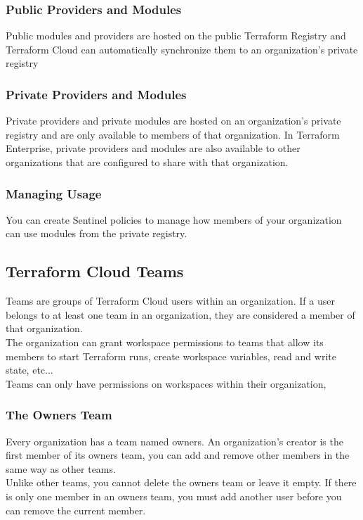 \documentclass[12pt, letterpaper, twoside]{article}
\begin{document}
\subsubsection{Public Providers and Modules}
Public modules and providers are hosted on the public Terraform Registry and Terraform Cloud can automatically 
synchronize them to an organization's private registry

\subsubsection{Private Providers and Modules}
Private providers and private modules are hosted on an organization's private registry and are only 
available to members of that organization. In Terraform Enterprise, private providers and modules are 
also available to other organizations that are configured to share with that organization.

\subsubsection{Managing Usage}
You can create Sentinel policies to manage how members of your organization can use modules from the private 
registry.

\subsection{Terraform Cloud Teams}
Teams are groups of Terraform Cloud users within an organization. If a user belongs to at least one team in 
an organization, they are considered a member of that organization.\\

The organization can grant workspace permissions to teams that allow its members to start Terraform runs, 
create workspace variables, read and write state, etc...\\
Teams can only have permissions on workspaces within their organization,

\subsubsection{The Owners Team}
Every organization has a team named owners. An organization's creator is the first member of its owners 
team, you can add and remove other members in the same way as other teams.\\

Unlike other teams, you cannot delete the owners team or leave it empty. If there is only one member in an 
owners team, you must add another user before you can remove the current member.
\end{document}
